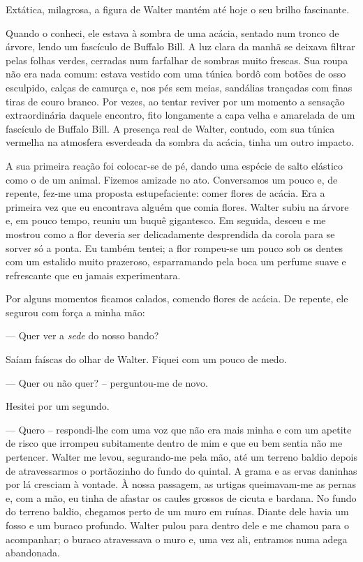 Extática, milagrosa, a figura de Walter mantém até hoje o seu brilho fascinante.

Quando o conheci, ele estava à sombra de uma acácia, sentado num tronco de árvore, lendo um fascículo de Buffalo Bill.  A luz clara da manhã se deixava filtrar pelas folhas verdes, cerradas num farfalhar de sombras muito frescas. Sua roupa não era nada comum: estava vestido com uma túnica bordô com botões de osso esculpido, calças de camurça e, nos pés sem meias, sandálias trançadas com finas tiras de couro branco. Por vezes, ao tentar reviver por um momento a sensação extraordinária daquele encontro, fito longamente a capa velha e amarelada de um fascículo de Buffalo Bill. A presença real de Walter, contudo, com sua túnica vermelha na atmosfera esverdeada da sombra da acácia, tinha um outro impacto.

A sua primeira reação foi colocar-se de pé, dando uma espécie de salto elástico como o de um animal. Fizemos amizade no ato. Conversamos um pouco e, de repente, fez-me uma proposta estupefaciente: comer flores de acácia. Era a primeira vez que eu encontrava alguém que comia flores. Walter subiu na árvore e, em pouco tempo, reuniu um buquê gigantesco. Em seguida, desceu e me mostrou como a flor deveria ser delicadamente desprendida da corola para se sorver só a ponta. Eu também tentei; a flor rompeu-se um pouco sob os dentes com um estalido muito prazeroso, esparramando pela boca um perfume suave e refrescante que eu jamais experimentara.

Por alguns momentos ficamos calados, comendo flores de acácia. De repente, ele segurou com força a minha mão: 

--- Quer ver a \textit{sede} do nosso bando?

Saíam faíscas do olhar de Walter. Fiquei com um pouco de medo. 

--- Quer ou não quer? -- perguntou-me de novo. 

Hesitei por um segundo. 

--- Quero -- respondi-lhe com uma voz que não era mais minha e com um apetite de risco que irrompeu subitamente dentro de mim e que eu bem sentia não me pertencer.
Walter me levou, segurando-me pela mão, até um terreno baldio depois de atravessarmos o portãozinho do fundo do quintal. A grama e as ervas daninhas por lá cresciam à vontade. À nossa passagem, as urtigas queimavam-me as pernas e, com a mão, eu tinha de afastar os caules grossos de cicuta e bardana. No fundo do terreno baldio, chegamos perto de um muro em ruínas. Diante dele havia um fosso e um buraco profundo. Walter pulou para dentro dele e me chamou para o acompanhar; o buraco atravessava o muro e, uma vez ali, entramos numa adega abandonada.

